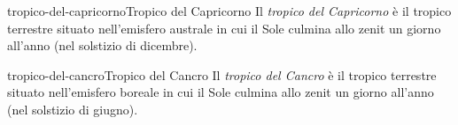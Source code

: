 \documentclass[preview]{standalone}
\begin{document}
\begin{snippetdefinition}{tropico-del-capricorno}{Tropico del Capricorno}
    Il \textit{tropico del Capricorno} è il tropico terrestre
    situato nell'emisfero australe in cui il Sole
    culmina allo zenit un giorno all'anno (nel solstizio di dicembre).
\end{snippetdefinition}

\begin{snippetdefinition}{tropico-del-cancro}{Tropico del Cancro}
    Il \textit{tropico del Cancro} è il tropico terrestre
    situato nell'emisfero boreale in cui il Sole culmina
    allo zenit un giorno all'anno (nel solstizio di giugno).
\end{snippetdefinition}


\end{document}
